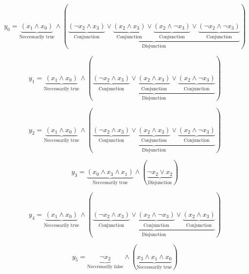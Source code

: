 \documentclass{scrartcl}
\begin{document}
	
\begin{equation}
	y_0 = \underbrace{\left(x_1 \wedge x_0\right)}_{\text{Neccessarily true}} \wedge (\underbrace{\underbrace{\left( \lnot x_2 \wedge x_3\right)}_{\text{Conjunction}} \lor \underbrace{\left(x_2 \wedge x_3\right)}_{\text{Conjunction}} \lor \underbrace{\left(x_2 \wedge  \lnot x_3\right)}_{\text{Conjunction}} \lor \underbrace{\left( \lnot x_2 \wedge  \lnot x_3\right)}_{\text{Conjunction}}}_{\text{Disjunction}})
\end{equation}

\begin{equation}
	y_1 = \underbrace{\left(x_1 \wedge x_0\right)}_{\text{Neccessarily true}} \wedge (\underbrace{\underbrace{\left( \lnot x_2 \wedge x_3\right)}_{\text{Conjunction}} \lor \underbrace{\left(x_2 \wedge x_3\right)}_{\text{Conjunction}} \lor \underbrace{\left(x_2 \wedge  \lnot x_3\right)}_{\text{Conjunction}}}_{\text{Disjunction}})
\end{equation}

\begin{equation}
	y_2 = \underbrace{\left(x_1 \wedge x_0\right)}_{\text{Neccessarily true}} \wedge (\underbrace{\underbrace{\left( \lnot x_2 \wedge x_3\right)}_{\text{Conjunction}} \lor \underbrace{\left(x_2 \wedge x_3\right)}_{\text{Conjunction}} \lor \underbrace{\left(x_2 \wedge  \lnot x_3\right)}_{\text{Conjunction}}}_{\text{Disjunction}})
\end{equation}

\begin{equation}
	y_3 = \underbrace{\left(x_0 \wedge x_3 \wedge x_1\right)}_{\text{Neccessarily true}} \wedge (\underbrace{ \lnot x_2 \lor x_2}_{\text{Disjunction}})
\end{equation}

\begin{equation}
	y_4 = \underbrace{\left(x_1 \wedge x_0\right)}_{\text{Neccessarily true}} \wedge (\underbrace{\underbrace{\left( \lnot x_2 \wedge x_3\right)}_{\text{Conjunction}} \lor \underbrace{\left(x_2 \wedge  \lnot x_3\right)}_{\text{Conjunction}} \lor \underbrace{\left(x_2 \wedge x_3\right)}_{\text{Conjunction}}}_{\text{Disjunction}})
\end{equation}

\begin{equation}
	y_5 = \underbrace{ \lnot x_2}_{\text{Neccessarily false}} \wedge (\underbrace{x_3 \wedge x_1 \wedge x_0}_{\text{Neccessarily true}})
\end{equation}
\end{document}
